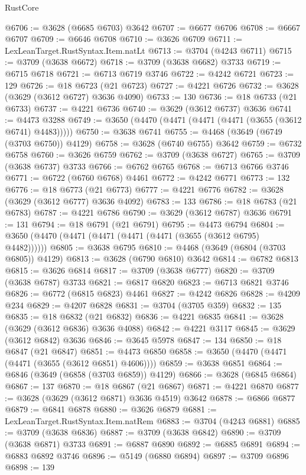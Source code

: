 \begin{lexlean}{RustCore}
\begin{coremodule}
@6706 := @3628 (@6685 @6703) @3642
@6707 := @6677 @6706
@6708 := @6667 @6707
@6709 := @6646 @6708
@6710 := @3626 @6709
@6711 := LexLeanTarget.RustSyntax.Item.natLt
@6713 := @3704 (@4243 @6711)
@6715 := @3709 (@3638 @6672)
@6718 := @3709 (@3638 @6682) @3733
@6719 := @6715 @6718
@6721 := @6713 @6719 @3746
@6722 := @4242 @6721
@6723 := 129
@6726 := @18 @6723 (@21 @6723)
@6727 := @4221 @6726
@6732 := @3628 (@3629 (@3612 @6727) @3636 @4090)
@6733 := 130
@6736 := @18 @6733 (@21 @6733)
@6737 := @4221 @6736
@6740 := @3629 (@3612 @6737) @3636
@6741 := @4473 @3288
@6749 := @3650 (@4470 (@4471 (@4471 (@4471 (@3655 (@3612 @6741) @4483)))))
@6750 := @3638 @6741
@6755 := @4468 (@3649 (@6749 (@3703 @6750)) @4129)
@6758 := @3628 (@6740 @6755) @3642
@6759 := @6732 @6758
@6760 := @3626 @6759
@6762 := @3709 (@3638 @6727)
@6765 := @3709 (@3638 @6737) @3733
@6766 := @6762 @6765
@6768 := @6713 @6766 @3746
@6771 := @6722 (@6760 @6768) @4461
@6772 := @4242 @6771
@6773 := 132
@6776 := @18 @6773 (@21 @6773)
@6777 := @4221 @6776
@6782 := @3628 (@3629 (@3612 @6777) @3636 @4092)
@6783 := 133
@6786 := @18 @6783 (@21 @6783)
@6787 := @4221 @6786
@6790 := @3629 (@3612 @6787) @3636
@6791 := 131
@6794 := @18 @6791 (@21 @6791)
@6795 := @4473 @6794
@6804 := @3650 (@4470 (@4471 (@4471 (@4471 (@4471 (@3655 (@3612 @6795) @4482))))))
@6805 := @3638 @6795
@6810 := @4468 (@3649 (@6804 (@3703 @6805)) @4129)
@6813 := @3628 (@6790 @6810) @3642
@6814 := @6782 @6813
@6815 := @3626 @6814
@6817 := @3709 (@3638 @6777)
@6820 := @3709 (@3638 @6787) @3733
@6821 := @6817 @6820
@6823 := @6713 @6821 @3746
@6826 := @6772 (@6815 @6823) @4461
@6827 := @4242 @6826
@6828 := @4209 @234
@6829 := @4207 @6828
@6831 := @3704 (@3705 @359)
@6832 := 135
@6835 := @18 @6832 (@21 @6832)
@6836 := @4221 @6835
@6841 := @3628 (@3629 (@3612 @6836) @3636 @4088)
@6842 := @4221 @3117
@6845 := @3629 (@3612 @6842) @3636
@6846 := @3645 @5978
@6847 := 134
@6850 := @18 @6847 (@21 @6847)
@6851 := @4473 @6850
@6858 := @3650 (@4470 (@4471 (@4471 (@3655 (@3612 @6851) @4606))))
@6859 := @3638 @6851
@6864 := @6846 (@3649 (@6858 (@3703 @6859)) @4129)
@6866 := @3628 (@6845 @6864)
@6867 := 137
@6870 := @18 @6867 (@21 @6867)
@6871 := @4221 @6870
@6877 := @3628 (@3629 (@3612 @6871) @3636 @4519) @3642
@6878 := @6866 @6877
@6879 := @6841 @6878
@6880 := @3626 @6879
@6881 := LexLeanTarget.RustSyntax.Item.natRem
@6883 := @3704 (@4243 @6881)
@6885 := @3709 (@3638 @6836)
@6887 := @3709 (@3638 @6842)
@6890 := @3709 (@3638 @6871) @3733
@6891 := @6887 @6890
@6892 := @6885 @6891
@6894 := @6883 @6892 @3746
@6896 := @5149 (@6880 @6894)
@6897 := @3709 @6896
@6898 := 139

\end{coremodule}
\end{lexlean}
